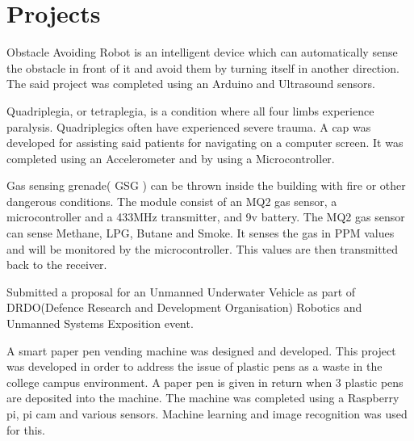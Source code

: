 \documentclass[]{deedy-resume-openfont}
\begin{document}
\section{Projects}
\begin{tightemize}
    \item Obstacle Avoiding Robot is an intelligent device which can automatically sense the obstacle in front of it and avoid them by turning itself in another direction. The said project was completed using an Arduino and Ultrasound sensors. 
\end{tightemize}
\begin{tightemize}
    \item Quadriplegia, or tetraplegia, is a condition where all four limbs experience paralysis. Quadriplegics often have experienced severe trauma. A cap was developed for assisting said patients for navigating on a computer screen. It was completed using an Accelerometer and by using a Microcontroller.
\end{tightemize}
\begin{tightemize}
    \item Gas sensing grenade( GSG ) can be thrown inside the building with fire or other dangerous conditions. The module consist of an MQ2 gas sensor, a microcontroller and a 433MHz transmitter, and 9v battery. The MQ2 gas sensor can sense Methane, LPG, Butane and Smoke. It senses the gas in PPM values and will be monitored by the microcontroller. This values are then transmitted back to the receiver.
\end{tightemize}
\begin{tightemize}
    \item Submitted a proposal for an Unmanned Underwater Vehicle as part of DRDO(Defence Research and Development Organisation) Robotics and Unmanned Systems Exposition event.
\end{tightemize}
\begin{tightemize}
    \item A smart paper pen vending machine was designed and developed. This project was developed in order to address the issue of plastic pens as a waste in the college campus environment. A paper pen is given in return when 3 plastic pens are deposited into the machine. The machine was completed using a Raspberry pi, pi cam and various sensors. Machine learning and image recognition was used for this.
\end{tightemize}
\sectionsep
\end{document}
